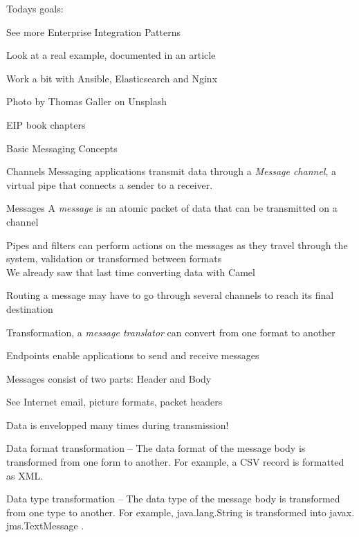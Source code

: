 \documentclass[Screen16to9,17pt]{foils}
\begin{document}


Todays goals:
\begin{list2}
\item See more Enterprise Integration Patterns
\item Look at a real example, documented in an article
\item Work a bit with Ansible, Elasticsearch and Nginx
\end{list2}

Photo by Thomas Galler on Unsplash



EIP book chapters




Basic Messaging Concepts
\begin{list2}
\item Channels Messaging applications transmit data through a \emph{Message channel}, a virtual pipe that connects a sender to a receiver.
\item Messages A \emph{message} is an atomic packet of data that can be transmitted on a channel
\item Pipes and filters can perform actions on the messages as they travel through the system, validation or transformed between formats\\
We already saw that last time converting data with Camel
\item Routing a message may have to go through several channels to reach its final destination
\item Transformation, a \emph{message translator} can convert from one format to another
\item Endpoints enable applications to send and receive messages
\end{list2}



\begin{list2}
\item Messages consist of two parts: Header and Body
\item See Internet email, picture formats, packet headers
\item Data is envelopped many times during transmission!
\item Data format transformation -- The data format of the message body is transformed
from one form to another. For example, a CSV record is formatted as XML.
\item Data type transformation -- The data type of the message body is transformed from
one type to another. For example, java.lang.String is transformed into javax.
jms.TextMessage .
\end{list2}
\end{document}
